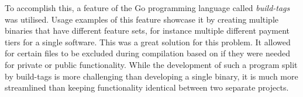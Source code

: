 \noindent
To accomplish this, a feature of the Go programming language called \textit{build-tags} was utilised.
Usage examples of this feature showcase it by creating multiple binaries that have different feature sets, for instance multiple different payment tiers for a single software.
This was a great solution for this problem. It allowed for certain files to be excluded during compilation based on if they were needed for private or public functionality.
While the development of such a program split by build-tags is more challenging than developing a single binary, it is much more streamlined than keeping functionality identical between two separate projects.